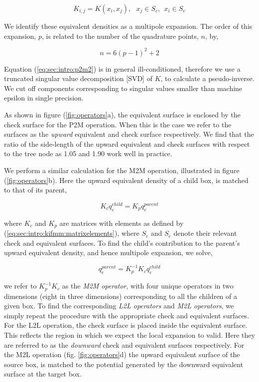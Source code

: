 \documentclass{IEEEcsmag}
\begin{document}
\begin{equation}
	K_{i, j} = K(x_i, x_j), \> \> \> x_j \in S_c, \> \> x_i \in S_e
	\label{eq:sec:intro:kifmm:matrixelements}
\end{equation}

We identify these equivalent densities as a multipole expansion. The order of this expansion, $p$, is related to the number of the quadrature points, $n$,  by,

\begin{equation}
	n = 6(p-1)^2+2
	\label{eq:sec:intro:kifmm:nquads}
\end{equation}

Equation (\ref{eq:sec:intro:p2m2}) is in general ill-conditioned, therefore we use a truncated singular value decomposition [SVD] of $K$, to calculate a pseudo-inverse. We cut off components corresponding to singular values smaller than machine epsilon in single precision.

As shown in figure (\ref{fig:operators}a), the equivalent surface is enclosed by the check surface for the P2M operation. When this is the case we refer to the surfaces as the \textit{upward} equivalent and check surface respectively. We find that the ratio of the side-length of the upward equivalent and check surfaces with respect to the tree node as 1.05 and 1.90 work well in practice.

We perform a similar calculation for the M2M operation, illustrated in figure (\ref{fig:operators}b). Here the upward equivalent density of a child box, is matched to that of its parent,

\begin{equation}
	K_c q_e^{child} = K_p q_e ^{parent}
\end{equation}

where $K_c$ and $K_p$ are matrices with elements as defined by (\ref{eq:sec:intro:kifmm:matrixelements}), where $S_c$ and $S_e$ denote their relevant check and equivalent surfaces. To find the child's contribution to the parent's upward equivalent density, and hence multipole expansion, we solve,

\begin{equation}
	q_e^{parent} = K_p^{-1}K_c q_e^{child}
\end{equation}

we refer to $K_p^{-1}K_c$ as the \textit{M2M operator}, with four unique operators in two dimensions (eight in three dimensions) corresponding to all the children of a given box. To find the corresponding \textit{L2L operators} and \textit{M2L operators}, we simply repeat the procedure with the appropriate check and equivalent surfaces. For the L2L operation, the check surface is placed inside the equivalent surface. This reflects the region in which we expect the local expansion to valid. Here they are referred to as the \textit{downward} check and equivalent surfaces respectively. For the M2L operation (fig. \ref{fig:operators}d) the upward equivalent surface of the source box, is matched to the potential generated by the downward equivalent surface at the target box.
\end{document}
